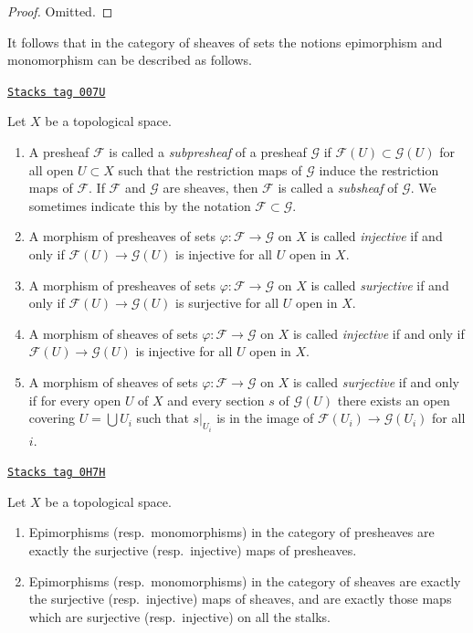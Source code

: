 \begin{proof}
Omitted.
\end{proof}

It follows that in the category of sheaves of sets
the notions epimorphism and monomorphism can be described
as follows.

\begin{definition}
\label{sheaves-definition-injective-surjective}
\href{https://stacks.math.columbia.edu/tag/007U}{\texttt{Stacks tag 007U}}

Let $X$ be a topological space.
\begin{enumerate}
\item A presheaf $\mathcal{F}$ is called a {\it subpresheaf} of a presheaf
$\mathcal{G}$ if $\mathcal{F}(U) \subset \mathcal{G}(U)$ for all open
$U \subset X$ such that the restriction maps of $\mathcal{G}$ induce the
restriction maps of $\mathcal{F}$. If $\mathcal{F}$ and
$\mathcal{G}$ are sheaves, then $\mathcal{F}$ is called a {\it subsheaf}
of $\mathcal{G}$. We sometimes indicate this by the notation
$\mathcal{F} \subset \mathcal{G}$.
\item A morphism of presheaves of sets $\varphi : \mathcal{F} \to \mathcal{G}$
on $X$ is called {\it injective} if and only if
$\mathcal{F}(U) \to \mathcal{G}(U)$ is injective for all $U$ open in $X$.
\item A morphism of presheaves of sets $\varphi : \mathcal{F} \to \mathcal{G}$
on $X$ is called {\it surjective} if and only if
$\mathcal{F}(U) \to \mathcal{G}(U)$ is surjective for all $U$ open in $X$.
\item A morphism of sheaves of sets $\varphi : \mathcal{F} \to \mathcal{G}$
on $X$ is called {\it injective} if and only if
$\mathcal{F}(U) \to \mathcal{G}(U)$ is injective for all $U$ open in $X$.
\item A morphism of sheaves of sets $\varphi : \mathcal{F} \to \mathcal{G}$
on $X$ is called {\it surjective} if and only if for every open
$U$ of $X$ and every section $s$ of $\mathcal{G}(U)$ there exists an
open covering $U = \bigcup U_i$ such that $s|_{U_i}$ is in
the image of $\mathcal{F}(U_i) \to \mathcal{G}(U_i)$ for all $i$.
\end{enumerate}
\end{definition}


\begin{lemma}
\label{sheaves-lemma-characterize-epi-mono}
\href{https://stacks.math.columbia.edu/tag/0H7H}{\texttt{Stacks tag 0H7H}}

Let $X$ be a topological space.
\begin{enumerate}
\item Epimorphisms (resp.\ monomorphisms) in the category of
presheaves are exactly the surjective (resp.\ injective) maps
of presheaves.
\item Epimorphisms (resp.\ monomorphisms) in the category of
sheaves are exactly the surjective (resp.\ injective) maps
of sheaves, and are exactly those maps which are surjective
(resp.\ injective) on all the stalks.
\end{enumerate}
\end{lemma}

